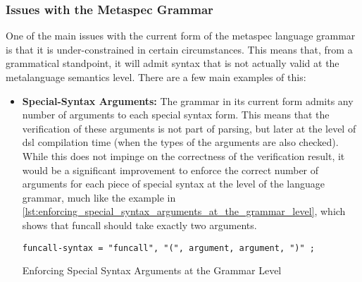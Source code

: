 \subsubsection{Issues with the Metaspec Grammar} %
\label{ssub:issues_with_the_metaspec_grammar}
One of the main issues with the current form of the \gls{metaspec} language grammar is that it is under-constrained in certain circumstances. 
This means that, from a grammatical standpoint, it will admit syntax that is not actually valid at the metalanguage semantics level.
There are a few main examples of this:
\begin{itemize}
    \item \textbf{Special-Syntax Arguments:} The grammar in its current form admits any number of arguments to each special syntax form. 
    This means that the verification of these arguments is not part of parsing, but later at the level of \gls{dsl} compilation time (when the types of the arguments are also checked).
    While this does not impinge on the correctness of the verification result, it would be a significant improvement to enforce the correct number of arguments for each piece of special syntax at the level of the language grammar, much like the example in \autoref{lst:enforcing_special_syntax_arguments_at_the_grammar_level}, which shows that funcall should take exactly two arguments. 
\begin{listing}[!htb]
\begin{verbatim}
funcall-syntax = "funcall", "(", argument, argument, ")" ;
\end{verbatim}
\caption{Enforcing Special Syntax Arguments at the Grammar Level}
\label{lst:enforcing_special_syntax_arguments_at_the_grammar_level}
\end{listing}


\end{itemize}
